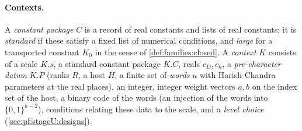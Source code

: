 \paragraph{Contexts.}
A \emph{constant package} $C$ is a record of real constants and lists of real constants; it is \emph{standard} if these
satisfy a fixed list of numerical conditions, and \emph{large} for a transported constant $K_0$ in the sense of
\cref{def:families:closed}. A \emph{context} $K$ consists of a scale $K.s$, a standard constant package $K.C$, reals
$c_D,c_h$, a \emph{pre-character datum} $K.P$ (ranks $R$, a host $H$, a finite set of \emph{words} $u$ with
Harish-Chandra parameters at the real places), an integer, integer weight vectors $a,b$ on the index set of the host,
a binary code of the words (an injection of the words into $\{0,1\}^{k-2}$), conditions relating these data to the
scale, and a \emph{level choice} (\cref{sec:pf:stageU:designs}).

